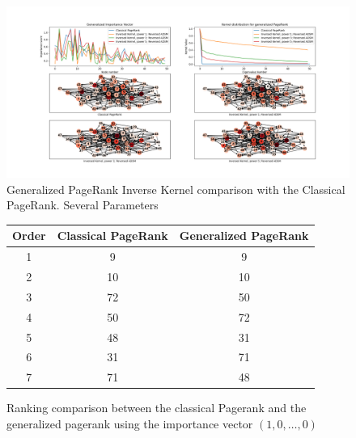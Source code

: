 \documentclass{article}
\begin{document}
\begin{figure}[h!]
    \centering
    \centerline{
    \includegraphics[width= 1.55\textwidth]{results_figures/inverse_kernel_comparison.png}
    }
    \caption{Generalized PageRank Inverse Kernel comparison with the Classical PageRank. Several Parameters}
    \label{fig:inverseKcomparison}
\end{figure}

\begin{figure}[h!]
\centering
\begin{tabular}{c|c|c}
    \textbf{Order} & \textbf{Classical PageRank} & \textbf{Generalized PageRank} \\
    \hline
    1 & 9 & 9 \\
    2 & 10 & 10\\
    3 & 72 & 50\\
    4 & 50 & 72\\
    5 & 48 & 31 \\
    6 & 31 & 71\\
    7 & 71 & 48\\
    \hline
    
\end{tabular}

    \caption{Ranking comparison between the classical Pagerank and the generalized pagerank using the importance vector $(1, 0, \hdots, 0)$}
    \label{fig:ranking1}
\end{figure}
\end{document}
